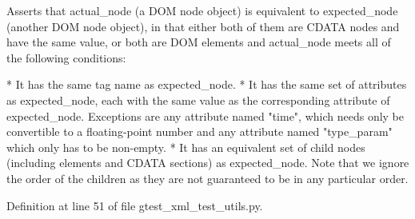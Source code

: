 \begin{DoxyVerb}
Asserts that actual_node (a DOM node object) is equivalent to
expected_node (another DOM node object), in that either both of
them are CDATA nodes and have the same value, or both are DOM
elements and actual_node meets all of the following conditions:

*  It has the same tag name as expected_node.
*  It has the same set of attributes as expected_node, each with
   the same value as the corresponding attribute of expected_node.
   Exceptions are any attribute named "time", which needs only be
   convertible to a floating-point number and any attribute named
   "type_param" which only has to be non-empty.
*  It has an equivalent set of child nodes (including elements and
   CDATA sections) as expected_node.  Note that we ignore the
   order of the children as they are not guaranteed to be in any
   particular order.
\end{DoxyVerb}
 

\-Definition at line 51 of file gtest\-\_\-xml\-\_\-test\-\_\-utils.\-py.


